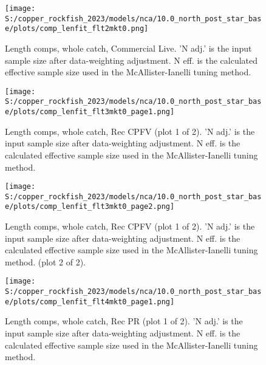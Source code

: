\documentclass[11pt,
  letterpaper,
]{article}
\begin{document}
\begin{figure}
{\centering
\texttt{[image: S:/copper\_rockfish\_2023/models/nca/10.0\_north\_post\_star\_base/plots/comp\_lenfit\_flt2mkt0.png]}
}
\caption{Length comps, whole catch, Commercial Live.  'N adj.' is the input sample size after data-weighting adjustment. N eff. is the calculated effective sample size used in the McAllister-Ianelli tuning method.\label{fig:comp-lenfit-flt2mkt0}}
\end{figure}

\begin{figure}
{\centering
\texttt{[image: S:/copper\_rockfish\_2023/models/nca/10.0\_north\_post\_star\_base/plots/comp\_lenfit\_flt3mkt0\_page1.png]}
}
\caption{Length comps, whole catch, Rec CPFV (plot 1 of 2).  'N adj.' is the input sample size after data-weighting adjustment. N eff. is the calculated effective sample size used in the McAllister-Ianelli tuning method.\label{fig:comp-lenfit-flt3mkt0-page1}}
\end{figure}

\begin{figure}
{\centering
\texttt{[image: S:/copper\_rockfish\_2023/models/nca/10.0\_north\_post\_star\_base/plots/comp\_lenfit\_flt3mkt0\_page2.png]}
}
\caption{Length comps, whole catch, Rec CPFV (plot 1 of 2).  'N adj.' is the input sample size after data-weighting adjustment. N eff. is the calculated effective sample size used in the McAllister-Ianelli tuning method. (plot 2 of 2).\label{fig:comp-lenfit-flt3mkt0-page2}}
\end{figure}

\begin{figure}
{\centering
\texttt{[image: S:/copper\_rockfish\_2023/models/nca/10.0\_north\_post\_star\_base/plots/comp\_lenfit\_flt4mkt0\_page1.png]}
}
\caption{Length comps, whole catch, Rec PR (plot 1 of 2).  'N adj.' is the input sample size after data-weighting adjustment. N eff. is the calculated effective sample size used in the McAllister-Ianelli tuning method.\label{fig:comp-lenfit-flt4mkt0-page1}}
\end{figure}
\end{document}
